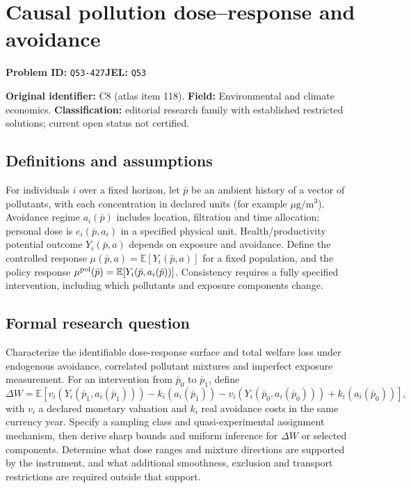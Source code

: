 \documentclass[11pt,a4paper]{article}
\begin{document}
\section*{Causal pollution dose–response and avoidance}
\textbf{Problem ID:} \texttt{Q53-427}\quad \textbf{JEL:} \texttt{Q53}\par
\label{problem:OP-0118}
\label{atlas:prob:C8}

\noindent\textbf{Original identifier:} C8 (atlas item 118). \textbf{Field:} Environmental and climate economics. \textbf{Classification:} editorial research family with established restricted solutions; current open status not certified.

\subsection*{Definitions and assumptions}

For individuals $i$ over a fixed horizon, let $\bar p$ be an ambient history of a vector of pollutants, with each concentration in declared units (for example $\mu\mathrm g/\mathrm m^3$). Avoidance regime $a_i(\bar p)$ includes location, filtration and time allocation; personal dose is $e_i(\bar p,a_i)$ in a specified physical unit. Health/productivity potential outcome $Y_i(\bar p,a)$ depends on exposure and avoidance. Define the controlled response $\mu(\bar p,a)=\mathbb E[Y_i(\bar p,a)]$ for a fixed population, and the policy response $\mu^{\rm pol}(\bar p)=\mathbb E[Y_i(\bar p,a_i(\bar p))]$. Consistency requires a fully specified intervention, including which pollutants and exposure components change.

\subsection*{Formal research question}

Characterize the identifiable dose-response surface and total welfare loss under endogenous avoidance, correlated pollutant mixtures and imperfect exposure measurement. For an intervention from $\bar p_0$ to $\bar p_1$, define
\[
\Delta W=\mathbb E\!\left[
v_i(Y_i(\bar p_1,a_i(\bar p_1)))-k_i(a_i(\bar p_1))
-v_i(Y_i(\bar p_0,a_i(\bar p_0)))+k_i(a_i(\bar p_0))
\right],
\]
with $v_i$ a declared monetary valuation and $k_i$ real avoidance costs in the same currency year. Specify a sampling class and quasi-experimental assignment mechanism, then derive sharp bounds and uniform inference for $\Delta W$ or selected components. Determine what dose ranges and mixture directions are supported by the instrument, and what additional smoothness, exclusion and transport restrictions are required outside that support.
\end{document}

